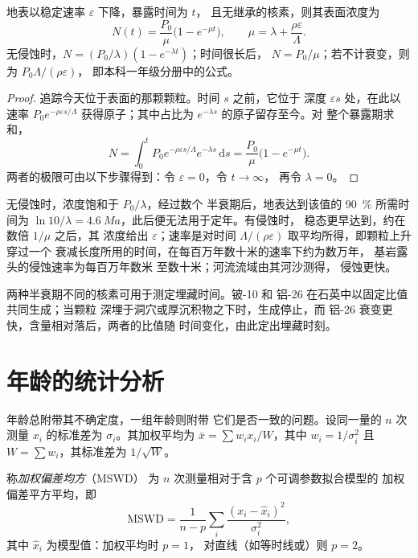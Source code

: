 \begin{theorem}[考虑衰变与侵蚀的暴露]\label{thm:b3:advanced-geochronology:exposure}
地表以稳定速率 $\varepsilon$ 下降，暴露时间为 $t$，
且无继承的核素，则其表面浓度为
\[
N(t) = \frac{P_0}{\mu}\bigl(1 - e^{-\mu t}\bigr), \qquad
\mu = \lambda + \frac{\rho\varepsilon}{\Lambda}.
\]
无侵蚀时，$N = (P_0/\lambda)(1 - e^{-\lambda t})$；时间很长后，
$N = P_0/\mu$；若不计衰变，则为 $P_0\Lambda/(\rho\varepsilon)$，
即本科一年级分册中的公式。
\end{theorem}

\begin{proof}
追踪今天位于表面的那颗颗粒。时间 $s$ 之前，它位于
深度 $\varepsilon s$ 处，在此以速率 $P_0e^{-\rho\varepsilon
s/\Lambda}$ 获得原子；其中占比为 $e^{-\lambda s}$ 的原子留存至今。对
整个暴露期求和，
\[
N = \int_0^t P_0e^{-\rho\varepsilon s/\Lambda}e^{-\lambda s}\,\mathrm ds
= \frac{P_0}{\mu}\bigl(1 - e^{-\mu t}\bigr).
\]
两者的极限可由以下步骤得到：令 $\varepsilon = 0$，令 $t \to \infty$，
再令 $\lambda = 0$。
\end{proof}

无侵蚀时，浓度饱和于 $P_0/\lambda$，经过数个
半衰期后，地表达到该值的 \qty{90}{\percent} 所需时间为 $\ln 10/\lambda
= \qty{4.6}{Ma}$，此后便无法用于定年。有侵蚀时，
稳态更早达到，约在数倍 $1/\mu$ 之后，其
浓度给出 $\varepsilon$；速率是对时间
$\Lambda/(\rho\varepsilon)$ 取平均所得，即颗粒上升穿过一个
衰减长度所用的时间，在每百万年数十米的速率下约为数万年，
基岩露头的侵蚀速率为每百万年数米
至数十米；河流流域由其河沙测得，
侵蚀更快。

两种半衰期不同的核素可用于测定埋藏时间。铍-10 和
铝-26 在石英中以固定比值共同生成；当颗粒
深埋于洞穴或厚沉积物之下时，生成停止，而
铝-26 衰变更快，含量相对落后，两者的比值随
时间变化，由此定出埋藏时刻。

\section{年龄的统计分析}\label{sec:b3:advanced-geochronology:statistics}

年龄总附带其不确定度，一组年龄则附带
它们是否一致的问题。设同一量的 $n$ 次测量 $x_i$ 的标准差为
$\sigma_i$。其加权平均为 $\bar x = \sum w_ix_i/W$，其中
$w_i = 1/\sigma_i^2$ 且 $W = \sum w_i$，其标准差为
$1/\sqrt W$。

\begin{definition}[加权偏差均方]\label{def:b3:advanced-geochronology:mswd}
称\emph{加权偏差均方}（MSWD）
为 $n$ 次测量相对于含 $p$ 个可调参数拟合模型的
加权偏差平方平均，即
\[
\mathrm{MSWD} = \frac{1}{n - p}\sum_i \frac{(x_i - \hat x_i)^2}{\sigma_i^2},
\]
其中 $\hat x_i$ 为模型值：加权平均时 $p = 1$，
对直线（如等时线或）则 $p = 2$。
\end{definition}

